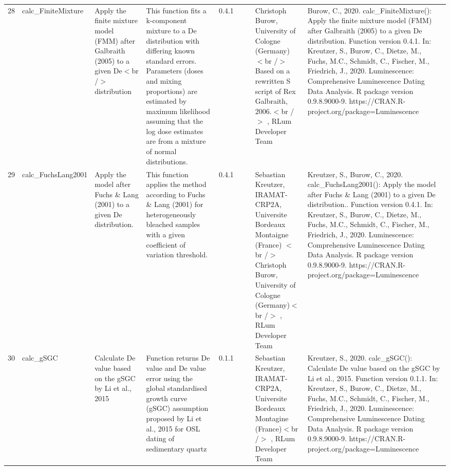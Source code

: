 \begin{table}[ht]
\begin{tabular}{rllllllll}
 \\ 
  28 & calc\_FiniteMixture & Apply the finite mixture model (FMM) after Galbraith (2005) to a given De$<$br /$>$ distribution & This function fits a k-component mixture to a De distribution with differing known standard errors. Parameters (doses and mixing proportions) are estimated by maximum likelihood assuming that the log dose estimates are from a mixture of normal distributions. & 0.4.1
 &  &  & Christoph Burow, University of Cologne (Germany)  $<$br /$>$ Based on a rewritten S script of Rex Galbraith, 2006.$<$br /$>$ , RLum Developer Team & Burow, C., 2020. calc\_FiniteMixture(): Apply the finite mixture model (FMM) after Galbraith (2005) to a given De distribution. Function version 0.4.1. In: Kreutzer, S., Burow, C., Dietze, M., Fuchs, M.C., Schmidt, C., Fischer, M., Friedrich, J., 2020. Luminescence: Comprehensive Luminescence Dating Data Analysis. R package version 0.9.8.9000-9. https://CRAN.R-project.org/package=Luminescence
 \\ 
  29 & calc\_FuchsLang2001 & Apply the model after Fuchs \& Lang (2001) to a given De distribution. & This function applies the method according to Fuchs \& Lang (2001) for heterogeneously bleached samples with a given coefficient of variation threshold. & 0.4.1
 &  &  & Sebastian Kreutzer, IRAMAT-CRP2A, Universite Bordeaux Montaigne (France)  $<$br /$>$ Christoph Burow, University of Cologne (Germany)$<$br /$>$ , RLum Developer Team & Kreutzer, S., Burow, C., 2020. calc\_FuchsLang2001(): Apply the model after Fuchs \& Lang (2001) to a given De distribution.. Function version 0.4.1. In: Kreutzer, S., Burow, C., Dietze, M., Fuchs, M.C., Schmidt, C., Fischer, M., Friedrich, J., 2020. Luminescence: Comprehensive Luminescence Dating Data Analysis. R package version 0.9.8.9000-9. https://CRAN.R-project.org/package=Luminescence
 \\ 
  30 & calc\_gSGC & Calculate De value based on the gSGC by Li et al., 2015 & Function returns De value and De value error using the global standardised growth curve (gSGC) assumption proposed by Li et al., 2015 for OSL dating of sedimentary quartz & 0.1.1
 &  &  & Sebastian Kreutzer, IRAMAT-CRP2A, Universite Bordeaux Montagine (France)$<$br /$>$ , RLum Developer Team & Kreutzer, S., 2020. calc\_gSGC(): Calculate De value based on the gSGC by Li et al., 2015. Function version 0.1.1. In: Kreutzer, S., Burow, C., Dietze, M., Fuchs, M.C., Schmidt, C., Fischer, M., Friedrich, J., 2020. Luminescence: Comprehensive Luminescence Dating Data Analysis. R package version 0.9.8.9000-9. https://CRAN.R-project.org/package=Luminescence

\end{tabular}
\end{table}
